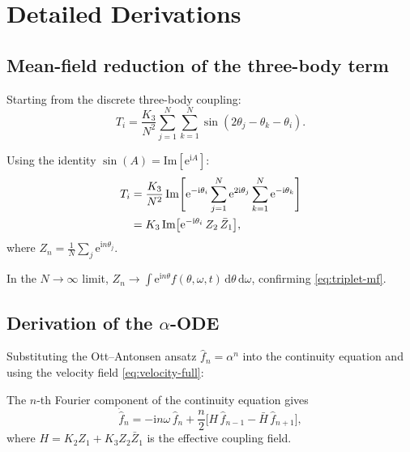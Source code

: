 \documentclass{article}
\newcommand{\dd}{\mathrm{d}}
\newcommand{\ii}{\mathrm{i}}
\newcommand{\ee}{\mathrm{e}}
\begin{document}




\newpage



\appendix
\section{Detailed Derivations}
\label{app:derivations}

\subsection{Mean-field reduction of the three-body term}

Starting from the discrete three-body coupling:
\begin{equation}
  T_i = \frac{K_3}{N^2}\sum_{j=1}^{N}\sum_{k=1}^{N}
  \sin(2\theta_j - \theta_k - \theta_i).
\end{equation}

Using the identity $\sin(A)=\mathrm{Im}[\ee^{\ii A}]$:
\begin{align}
  T_i &= \frac{K_3}{N^2}\,\mathrm{Im}\Biggl[
    \ee^{-\ii\theta_i}\sum_{j=1}^{N}\ee^{2\ii\theta_j}
    \sum_{k=1}^{N}\ee^{-\ii\theta_k}
  \Biggr] \notag \\
  &= K_3\,\mathrm{Im}\bigl[\ee^{-\ii\theta_i}\,Z_2\,\bar{Z}_1\bigr],
\end{align}
where $Z_n = \frac{1}{N}\sum_j \ee^{\ii n\theta_j}$.

In the $N\to\infty$ limit, $Z_n\to\int\ee^{\ii n\theta}f(\theta,\omega,t)\,
\dd\theta\,\dd\omega$, confirming \eqref{eq:triplet-mf}.

\subsection{Derivation of the $\alpha$-ODE}

Substituting the Ott--Antonsen ansatz $\hat{f}_n = \alpha^n$ into the
continuity equation and using the velocity field \eqref{eq:velocity-full}:

The $n$-th Fourier component of the continuity equation gives
\begin{equation}
  \dot{\hat{f}}_n = -\ii n\omega\,\hat{f}_n
  + \frac{n}{2}\bigl[H\,\hat{f}_{n-1} - \bar{H}\,\hat{f}_{n+1}\bigr],
\end{equation}
where $H = K_2 Z_1 + K_3 Z_2\bar{Z}_1$ is the effective coupling field.
\end{document}
